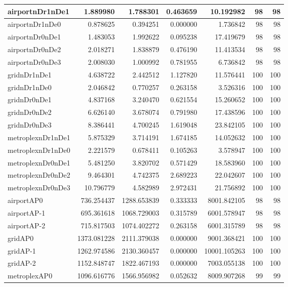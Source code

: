\begin{longtable}{|l|r|r|r|r|r|r|}
\endlastfoot
airportnDr1nDe1 & 1.889980 & 1.788301 & 0.463659 & 10.192982 & 98 & 98 \\ \hline
airportnDr1nDe0 & 0.878625 & 0.394251 & 0.000000 & 1.736842 & 98 & 98 \\ \hline
airportnDr0nDe1 & 1.483053 & 1.992622 & 0.095238 & 17.419679 & 98 & 98 \\ \hline
airportnDr0nDe2 & 2.018271 & 1.838879 & 0.476190 & 11.413534 & 98 & 98 \\ \hline
airportnDr0nDe3 & 2.008030 & 1.000992 & 0.781955 & 6.736842 & 98 & 98 \\ \hline
gridnDr1nDe1 & 4.638722 & 2.442512 & 1.127820 & 11.576441 & 100 & 100 \\ \hline
gridnDr1nDe0 & 2.046842 & 0.770257 & 0.263158 & 3.526316 & 100 & 100 \\ \hline
gridnDr0nDe1 & 4.837168 & 3.240470 & 0.621554 & 15.260652 & 100 & 100 \\ \hline
gridnDr0nDe2 & 6.626140 & 3.678074 & 0.791980 & 17.438596 & 100 & 100 \\ \hline
gridnDr0nDe3 & 8.386441 & 4.700245 & 1.619048 & 23.842105 & 100 & 100 \\ \hline
metroplexnDr1nDe1 & 5.875329 & 3.714191 & 1.674185 & 14.052632 & 100 & 100 \\ \hline
metroplexnDr1nDe0 & 2.221579 & 0.678411 & 0.105263 & 3.578947 & 100 & 100 \\ \hline
metroplexnDr0nDe1 & 5.481250 & 3.820702 & 0.571429 & 18.583960 & 100 & 100 \\ \hline
metroplexnDr0nDe2 & 9.464301 & 4.742375 & 2.689223 & 22.042607 & 100 & 100 \\ \hline
metroplexnDr0nDe3 & 10.796779 & 4.582989 & 2.972431 & 21.756892 & 100 & 100 \\ \hline
airportAP0 & 736.254437 & 1288.653839 & 0.333333 & 8001.842105 & 98 & 98 \\ \hline
airportAP-1 & 695.361618 & 1068.729003 & 0.315789 & 6001.578947 & 98 & 98 \\ \hline
airportAP-2 & 715.817503 & 1074.402272 & 0.263158 & 6001.315789 & 98 & 98 \\ \hline
gridAP0 & 1373.081228 & 2111.379038 & 0.000000 & 9001.368421 & 100 & 100 \\ \hline
gridAP-1 & 1262.974586 & 2130.360457 & 0.000000 & 10001.105263 & 100 & 100 \\ \hline
gridAP-2 & 1152.848747 & 1822.467193 & 0.000000 & 7003.055138 & 100 & 100 \\ \hline
metroplexAP0 & 1096.616776 & 1566.956982 & 0.052632 & 8009.907268 & 99 & 99 \\ \hline

\end{longtable}
